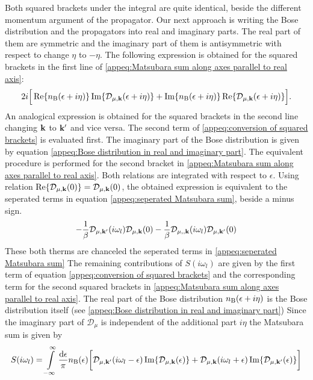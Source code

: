 Both squared brackets under the integral are quite identical, beside the different momentum argument of the propagator.
Our next approach is writing the Bose distribution  and the propagators into real and imaginary parts.
The real part of them are symmetric and the imaginary part of them is antisymmetric with respect to change $\eta$ to $-\eta$.
The following expression is obtained for the squared brackets in the first line of \eqref{appeq:Matsubara sum along axes parallel to real axis}:
%
\begin{align}
	2i\Big[ \Re{n_{\mathrm{B}}(\epsilon+i\eta)} \Im{\mathcal{D}_{\mu, \vb{k}}(\epsilon+i\eta)} + \Im{n_{\mathrm{B}}(\epsilon+i\eta)} \Re{\mathcal{D}_{\mu, \vb{k}}(\epsilon+i\eta)} \Big].
	\label{appeq:conversion of squared brackets}
\end{align}
%
An analogical expression is obtained for the squared brackets in the second line changing $\vb{k}$ to $\vb{k}'$ and vice versa.
The second term of \eqref{appeq:conversion of squared brackets} is evaluated first.
The imaginary part of the Bose distribution is given by equation \eqref{appeq:Bose distribution in real and imaginary part}.
The equivalent procedure is performed for the second bracket in \eqref{appeq:Matsubara sum along axes parallel to real axis}.
Both relations are integrated with respect to $\epsilon$.
Using relation $\Re{\mathcal{D}_{\mu,\vb{k}}(0)} = \mathcal{D}_{\mu,\vb{k}}(0)$, the obtained expression is equivalent to the seperated terms in equation \eqref{appeq:seperated Matsubara sum}, beside a minus sign.
%
\begin{align}
	-\frac{1}{\beta} \mathcal{D}_{\mu,\vb{k}'}(i\omega_{l}) \mathcal{D}_{\mu,\vb{k}}(0) - \frac{1}{\beta} \mathcal{D}_{\mu,,\vb{k}}(i\omega_{l}) \mathcal{D}_{\mu,\vb{k}'}(0)
\end{align}
%
These both therms are chanceled the seperated terms in \eqref{appeq:seperated Matsubara sum}
The remaining contributions of $S(i\omega_{l})$ are given by the first term of equation \eqref{appeq:conversion of squared brackets} and the corresponding term for the second squared brackets in \eqref{appeq:Matsubara sum along axes parallel to real axis}.
The real part of the Bose distribution $n_{\mathrm{B}}(\epsilon + i\eta)$ is the Bose distribution itself (see \eqref{appeq:Bose distribution in real and imaginary part})
Since the imaginary part of $\mathcal{D}_{\mu}$ is independent of the additional part $i\eta$ the Matsubara sum is given by
%
\begin{align}
	S(i\omega_{l}) = \int\limits_{-\infty}^{\infty} \frac{\dd{\epsilon}}{\pi} 
			n_{\mathrm{B}}(\epsilon) 
			\bigg[
				\mathcal{D}_{\mu,\vb{k}'}(i\omega_{l} - \epsilon) \Im{\mathcal{D}_{\mu, \vb{k}}(\epsilon)}
				+ 
				\mathcal{D}_{\mu,\vb{k}}(i\omega_{l} + \epsilon) \Im{\mathcal{D}_{\mu, \vb{k}'}(\epsilon)}
			\bigg]
\end{align}

